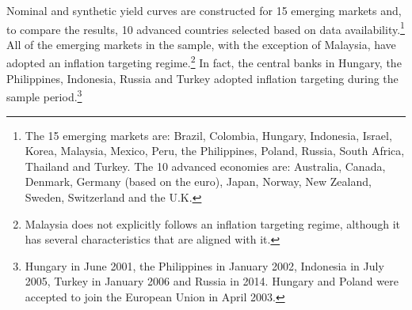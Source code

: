 {Nominal and synthetic yield curves are constructed for 15 emerging markets and, to compare the results, 10 advanced countries selected based on data availability.\footnote{ The 15 emerging markets are: Brazil, Colombia, Hungary, Indonesia, Israel, Korea, Malaysia, Mexico, Peru, the Philippines, Poland, Russia, South Africa, Thailand and Turkey. The 10 advanced economies are: Australia, Canada, Denmark, Germany (based on the euro), Japan, Norway, New Zealand, Sweden, Switzerland and the U.K.}  
All of the emerging markets in the sample, with the exception of Malaysia, have adopted an inflation targeting regime.\footnote{ Malaysia does not explicitly follows an inflation targeting regime, although it has several characteristics that are aligned with it.}
In fact, the central banks in Hungary, the Philippines, Indonesia, Russia and Turkey adopted inflation targeting during the sample period.\footnote{ Hungary in June 2001, the Philippines in January 2002, Indonesia in July 2005, Turkey in January 2006 and Russia in 2014. Hungary and Poland were accepted to join the European Union in April 2003.}

}
